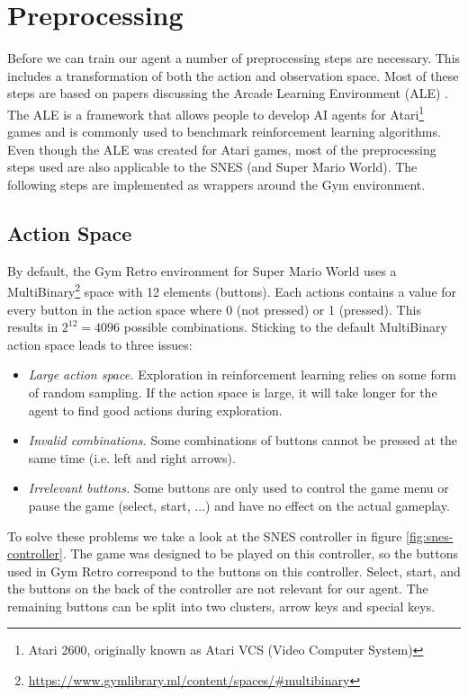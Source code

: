\documentclass{article}
\begin{document}
    \section{Preprocessing}
    Before we can train our agent a number of preprocessing steps are necessary.
    This includes a transformation of both the action and observation space.
    Most of these steps are based on papers discussing the Arcade Learning Environment (ALE) \cite{bellemare2013arcade,machado2018revisiting}.
    The ALE is a framework that allows people to develop AI agents for Atari\footnote{Atari 2600, originally known as Atari VCS (Video Computer System)} games and is commonly used to benchmark reinforcement learning algorithms.
    Even though the ALE was created for Atari games, most of the preprocessing steps used are also applicable to the SNES (and Super Mario World).
    The following steps are implemented as wrappers around the Gym environment.

    \subsection{Action Space}
    By default, the Gym Retro environment for Super Mario World uses a MultiBinary\footnote{\url{https://www.gymlibrary.ml/content/spaces/\#multibinary}} space with 12 elements (buttons).
    Each actions contains a value for every button in the action space where 0 (not pressed) or 1 (pressed). This results in $2^{12}=4096$ possible combinations.
    Sticking to the default MultiBinary action space leads to three issues:
    \begin{itemize}
        \item \emph{Large action space.}
            Exploration in reinforcement learning relies on some form of random sampling.
            If the action space is large, it will take longer for the agent to find good actions during exploration.
        \item \emph{Invalid combinations.}
            Some combinations of buttons cannot be pressed at the same time (i.e. left and right arrows).
        \item \emph{Irrelevant buttons.} Some buttons are only used to control the game menu or pause the game (select, start, ...) and have no effect on the actual gameplay.
    \end{itemize}

    To solve these problems we take a look at the SNES controller in figure \ref{fig:snes-controller}.
    The game was designed to be played on this controller, so the buttons used in Gym Retro correspond to the buttons on this controller.
    Select, start, and the buttons on the back of the controller are not relevant for our agent.
    The remaining buttons can be split into two clusters, arrow keys and special keys.
\end{document}
